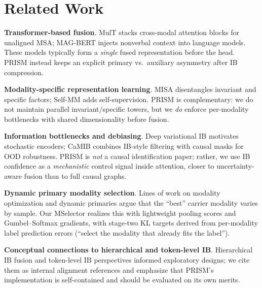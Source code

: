 \section{Related Work}
\label{sec:related}

\noindent \textbf{Transformer-based fusion}.
MulT \citep{tsai2019multimodal} stacks cross-modal attention blocks for unaligned
MSA; MAG-BERT \citep{rahman2020integrating} injects nonverbal context into
language models.
These models typically form a \emph{single} fused representation before the head.
PRISM instead keeps an explicit primary vs.\ auxiliary asymmetry after IB
compression.

\noindent \textbf{Modality-specific representation learning}.
MISA \citep{hazarika2020misa} disentangles invariant and specific factors; Self-MM
\citep{yu2021selfmm} adds self-supervision.
PRISM is complementary: we do not maintain parallel invariant/specific
towers, but we \emph{do} enforce per-modality bottlenecks with shared
dimensionality before fusion.

\noindent \textbf{Information bottlenecks and debiasing}.
Deep variational IB \citep{alemi2017deep} motivates stochastic encoders; CaMIB
\citep{jiang2025towards} combines IB-style filtering with causal masks for OOD
robustness.
PRISM is \emph{not} a causal identification paper; rather, we use IB
confidence as a \emph{mechanistic} control signal inside attention, closer to
uncertainty-aware fusion than to full causal graphs.

\noindent \textbf{Dynamic primary modality selection}.
Lines of work on modality optimization and dynamic primaries
\citep{mods2026align} argue that the ``best'' carrier modality varies by sample.
Our MSelector realizes this with lightweight pooling scores and Gumbel--Softmax
gradients, with stage-two KL targets derived from per-modality label prediction
errors (``select the modality that already fits the label'').

\noindent \textbf{Conceptual connections to hierarchical and token-level IB}.
Hierarchical IB fusion \citep{ithp2024align} and token-level IB perspectives
\citep{cyin2025align} informed exploratory designs; we cite them as internal
alignment references and emphasize that PRISM's implementation is
self-contained and should be evaluated on its own merits.
